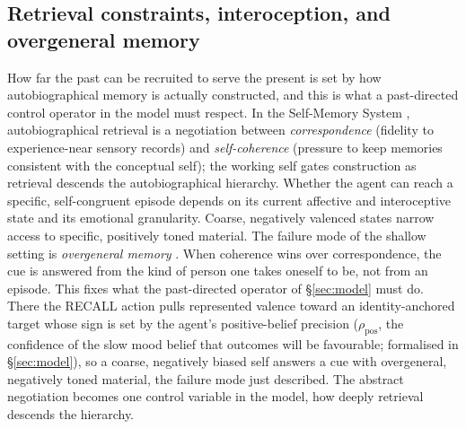 \documentclass[11pt,a4paper]{article}
\begin{document}
\subsection{Retrieval constraints, interoception, and overgeneral memory}
How far the past can be recruited to serve the present is set by how autobiographical
memory is actually constructed, and this is what a past-directed control operator in
the model must respect. In the Self-Memory System \citep{conway2000self}, autobiographical retrieval is a negotiation between
\emph{correspondence} (fidelity to experience-near sensory records) and
\emph{self-coherence} (pressure to keep memories consistent with the conceptual
self); the working self gates construction as retrieval descends the autobiographical
hierarchy. Whether the agent can reach a specific, self-congruent episode depends on
its current affective and interoceptive state and its emotional granularity. Coarse,
negatively valenced states narrow access to specific, positively toned material. The
failure mode of the shallow setting is \emph{overgeneral memory}
\citep{williams2007autobiographical}. When coherence wins over correspondence, the cue
is answered from the kind of person one takes oneself to be, not from an episode.
This fixes what the past-directed operator of \S\ref{sec:model} must do. There the
RECALL action pulls represented valence toward an identity-anchored target whose sign
is set by the agent's positive-belief precision ($\rho_{\text{pos}}$, the confidence of
the slow mood belief that outcomes will be favourable; formalised in
\S\ref{sec:model}), so a coarse, negatively biased self
answers a cue with overgeneral, negatively toned material, the failure mode just
described. The abstract negotiation becomes one control variable in the model, how
deeply retrieval descends the hierarchy.
\end{document}
